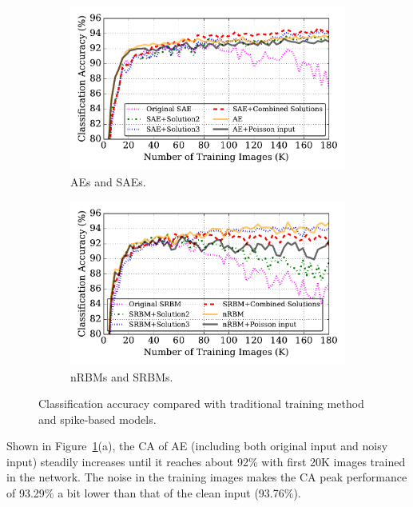 \begin{figure}
	\centering
	\begin{subfigure}[t]{0.49\textwidth}
		\includegraphics[width=\textwidth]{pics_sdlm/43_MNIST_SAE_all/compare_result.pdf}
		\caption{AEs and SAEs.}
	\end{subfigure}
	\begin{subfigure}[t]{0.49\textwidth}
		\includegraphics[width=\textwidth]{pics_sdlm/53_MNIST_SRBM_all/compare_result.pdf}
		\caption{nRBMs and SRBMs.}
	\end{subfigure}
	\caption{Classification accuracy compared with traditional training method and spike-based models.}
	\label{fig:sdlm_ca}
\end{figure}
Shown in Figure~\ref{fig:sdlm_ca}(a), the CA of AE (including both original input and noisy input) steadily increases until it reaches about 92\% with first 20K images trained in the network.
The noise in the training images makes the CA peak performance of 93.29\% a bit lower than that of the clean input (93.76\%).

